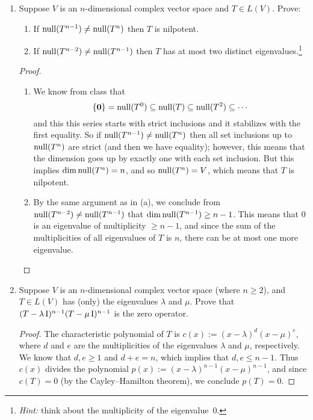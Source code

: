 \documentclass[11pt]{amsart}
\begin{document}
\begin{enumerate}[(1)]

\vspace{12pt}

\item Suppose $V$ is an $n$-dimensional complex vector space and $T \in L(V)$. Prove:
  \begin{enumerate}
  \item If $\operatorname{null}(T^{ n-1 }) \ne \operatorname{null}(T^n)$ then $T$ is nilpotent.
  \item If $\operatorname{null}(T^{ n-2 }) \ne \operatorname{null}(T^{ n-1 })$ then $T$ has at most two distinct eigenvalues.\footnote{\emph{Hint:} think about the multiplicity of the eigenvalue~0.}
  \end{enumerate}

\begin{proof}
\begin{enumerate}

\item We know from class that
\[
  \{ \mathbf 0 \} = \operatorname{null}(T^0) \subseteq \operatorname{null}(T) \subseteq \operatorname{null}(T^2) \subseteq \cdots
\]
and this this series starts with strict inclusions and it stabilizes with the first equality.
So if $\operatorname{null}(T^{ n-1 }) \ne \operatorname{null}(T^n)$ then all set inclusions up to $\operatorname{null}(T^n)$ are strict (and then we have equality); however, this means that the dimension goes up by exactly one with each set inclusion. But this implies $\dim \operatorname{null}(T^n) = n$, and so $\operatorname{null}(T^n) = V$, which means that $T$ is nilpotent.

\item By the same argument as in (a), we conclude from $\operatorname{null}(T^{ n-2 }) \ne \operatorname{null}(T^{ n-1 })$ that $\dim \operatorname{null}(T^{ n-1 }) \ge n-1$.
This means that 0 is an eigenvalue of multiplicity $\ge n-1$, and since the sum of the multiplicities of all eigenvalues of $T$ is $n$, there can be at most one more eigenvalue. \qedhere

\end{enumerate}
\end{proof}

\item Suppose $V$ is an $n$-dimensional complex vector space (where $n \ge 2$), and $T \in L(V)$ has (only) the eigenvalues $\lambda$ and $\mu$. Prove that $(T - \lambda \, \mathrm I)^{ n-1 } (T - \mu \, \mathrm I)^{ n-1 }$ is the zero operator.

\begin{proof}
The characteristic polynomial of $T$ is $c(x) := (x-\lambda)^d (x-\mu)^e$, where $d$ and $e$ are the multiplicities of the eigenvalues $\lambda$ and $\mu$, respectively.
We know that $d, e \ge 1$ and $d+e = n$, which implies that $d, e \le n-1$.
Thus $c(x)$ divides the polynomial $p(x) := (x-\lambda)^{ n-1 } (x-\mu)^{ n-1 }$, and since $c(T) = 0$ (by the Cayley--Hamilton theorem), we conclude $p(T) = 0$.
\end{proof}


\end{enumerate}
\end{document}
